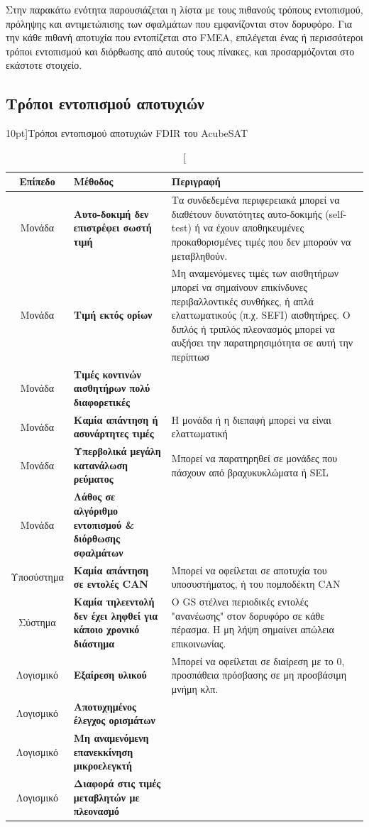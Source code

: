 \documentclass[a4paper,nobib]{tufte-book}
\begin{document}
Στην παρακάτω ενότητα παρουσιάζεται η λίστα με τους πιθανούς τρόπους εντοπισμού, πρόληψης και αντιμετώπισης των σφαλμάτων που εμφανίζονται στον δορυφόρο. Για την κάθε πιθανή αποτυχία που εντοπίζεται στο \acs{FMEA}, \autocite{retselis_acubesat_fmea_2020} επιλέγεται ένας ή περισσότεροι τρόποι εντοπισμού και διόρθωσης από αυτούς τους πίνακες, και προσαρμόζονται στο εκάστοτε στοιχείο.

\clearpage
\subsection{Τρόποι εντοπισμού αποτυχιών}
\begin{table}[h]
	\centering
	\caption[][10pt]{Τρόποι εντοπισμού αποτυχιών \acs{FDIR} του AcubeSAT}
	\label{tab:fdir_detect}
	\renewcommand{\arraystretch}{1.3}
	\begin{tabularx}{\textwidth}{@{}cL{5cm}X@{}}
		\toprule
		Επίπεδο & Μέθοδος & Περιγραφή \\ \midrule
		Μονάδα & \textbf{Αυτο-δοκιμή δεν επιστρέφει σωστή τιμή} & Τα συνδεδεμένα περιφερειακά μπορεί να διαθέτουν δυνατότητες αυτο-δοκιμής (self-test) ή να έχουν αποθηκευμένες προκαθορισμένες τιμές που δεν μπορούν να μεταβληθούν. \\
		Μονάδα & \textbf{Τιμή εκτός ορίων} & Μη αναμενόμενες τιμές των αισθητήρων μπορεί να σημαίνουν επικίνδυνες περιβαλλοντικές συνθήκες, ή απλά ελαττωματικούς (π.χ. \acs{SEFI}) αισθητήρες. Ο διπλός ή τριπλός πλεονασμός μπορεί να αυξήσει την παρατηρησιμότητα σε αυτή την περίπτωσ \\
		Μονάδα & \textbf{Τιμές κοντινών αισθητήρων πολύ διαφορετικές} &  \\
		Μονάδα & \textbf{Καμία απάντηση ή ασυνάρτητες τιμές} & Η μονάδα ή η διεπαφή μπορεί να είναι ελαττωματική \\
		Μονάδα & \textbf{Υπερβολικά μεγάλη κατανάλωση ρεύματος} & Μπορεί να παρατηρηθεί σε μονάδες που πάσχουν από βραχυκυκλώματα ή \acs{SEL} \\
		Μονάδα & \textbf{Λάθος σε αλγόριθμο εντοπισμού \& διόρθωσης σφαλμάτων} &  \\
		Υποσύστημα & \textbf{Καμία απάντηση σε εντολές \acs{CAN}} & Μπορεί να οφείλεται σε αποτυχία του υποσυστήματος, ή του πομποδέκτη \acs{CAN} \\
		Σύστημα & \textbf{Καμία τηλεεντολή δεν έχει ληφθεί για κάποιο χρονικό διάστημα} & Ο \acs{GS} στέλνει περιοδικές εντολές "ανανέωσης" στον δορυφόρο σε κάθε πέρασμα. Η μη λήψη σημαίνει απώλεια επικοινωνίας. \\
		Λογισμικό & \textbf{Εξαίρεση υλικού} & Μπορεί να οφείλεται σε διαίρεση με το 0, προσπάθεια πρόσβασης σε μη προσβάσιμη μνήμη κλπ. \\
		Λογισμικό & \textbf{Αποτυχημένος έλεγχος ορισμάτων} &  \\
		Λογισμικό & \textbf{Μη αναμενόμενη επανεκκίνηση μικροελεγκτή} &  \\
		Λογισμικό & \textbf{Διαφορά στις τιμές μεταβλητών με πλεονασμό} &  \\ \bottomrule
	\end{tabularx}
\end{table}
\end{document}
